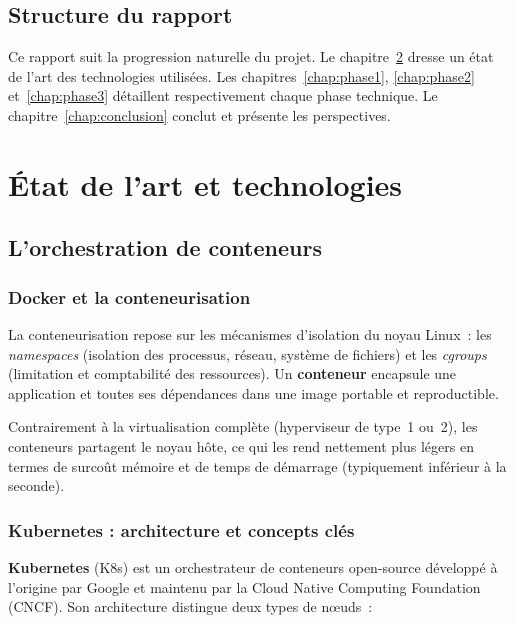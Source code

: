 \documentclass[12pt,a4paper,french]{report}
\newcommand{\kw}[1]{\textbf{#1}}
\begin{document}
\section{Structure du rapport}

Ce rapport suit la progression naturelle du projet. Le chapitre~\ref{chap:background} dresse un état de l'art des technologies utilisées. Les chapitres~\ref{chap:phase1}, \ref{chap:phase2} et~\ref{chap:phase3} détaillent respectivement chaque phase technique. Le chapitre~\ref{chap:conclusion} conclut et présente les perspectives.

\chapter{État de l'art et technologies}
\label{chap:background}

\section{L'orchestration de conteneurs}

\subsection{Docker et la conteneurisation}

La conteneurisation repose sur les mécanismes d'isolation du noyau Linux~: les \emph{namespaces} (isolation des processus, réseau, système de fichiers) et les \emph{cgroups} (limitation et comptabilité des ressources). Un \kw{conteneur} encapsule une application et toutes ses dépendances dans une image portable et reproductible.

Contrairement à la virtualisation complète (hyperviseur de type~1 ou~2), les conteneurs partagent le noyau hôte, ce qui les rend nettement plus légers en termes de surcoût mémoire et de temps de démarrage (typiquement inférieur à la seconde).

\subsection{Kubernetes : architecture et concepts clés}

\kw{Kubernetes} (K8s) est un orchestrateur de conteneurs open-source développé à l'origine par Google et maintenu par la Cloud Native Computing Foundation (CNCF). Son architecture distingue deux types de nœuds~:
\end{document}
